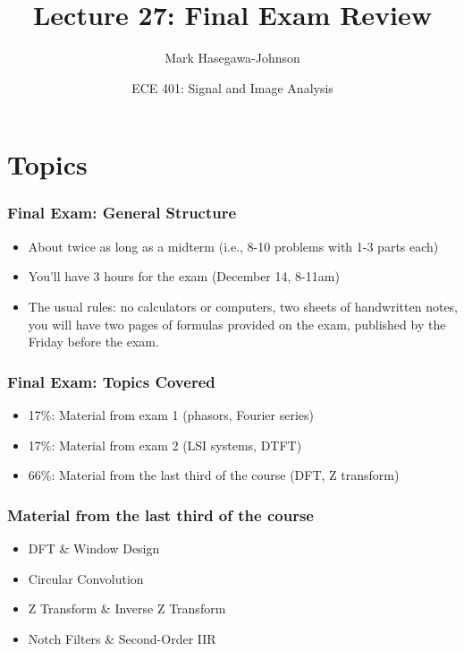 \documentclass{beamer}
\title{Lecture 27: Final Exam Review}
\author{Mark Hasegawa-Johnson}
\date{ECE 401: Signal and Image Analysis}
\begin{document}
\begin{frame}
  \maketitle
\end{frame}

\begin{frame}
  \tableofcontents
\end{frame}


\section{Topics}
\setcounter{subsection}{1}

\begin{frame}
  \frametitle{Final Exam: General Structure}

  \begin{itemize}
  \item About twice as long as a midterm (i.e., 8-10 problems with 1-3 parts each)
  \item You'll have 3 hours for the exam (December 14, 8-11am)
  \item The usual rules: no calculators or computers, two sheets of
    handwritten notes, you will have two pages of formulas provided on
    the exam, published by the Friday before the exam.  
  \end{itemize}
\end{frame}

\begin{frame}
  \frametitle{Final Exam: Topics Covered}

  \begin{itemize}
  \item 17\%: Material from exam 1 (phasors, Fourier series)
  \item 17\%: Material from exam 2 (LSI systems, DTFT)
  \item 66\%: Material from the last third of the course (DFT, Z transform)
  \end{itemize}
\end{frame}

\begin{frame}
  \frametitle{Material from the last third of the course}

  \begin{itemize}
  \item DFT \& Window Design
  \item Circular Convolution
  \item Z Transform \& Inverse Z Transform
  \item Notch Filters \& Second-Order IIR
  \end{itemize}
\end{frame}
\end{document}
